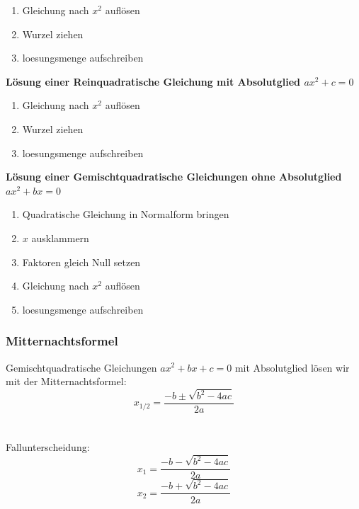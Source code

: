 \begin{multicols}{2}
    \begin{enumerate}
        \item Gleichung nach $x^2$ auflösen
        \item Wurzel ziehen
        \item loesungsmenge aufschreiben
    \end{enumerate}
    \textbf{Lösung einer Reinquadratische Gleichung mit Absolutglied $ax^2 + c = 0$}

    \begin{enumerate}
        \item Gleichung nach $x^2$ auflösen
        \item Wurzel ziehen
        \item loesungsmenge aufschreiben
    \end{enumerate}
    \textbf{Lösung einer Gemischtquadratische Gleichungen ohne Absolutglied $ax^2 + bx = 0$}

    \begin{enumerate}
        \item Quadratische Gleichung in Normalform bringen
        \item $x$ ausklammern
        \item  Faktoren gleich Null setzen
        \item Gleichung nach $x^2$ auflösen
        \item loesungsmenge aufschreiben
    \end{enumerate}

    \subsubsection{Mitternachtsformel}
    \vspace{-4mm}
    Gemischtquadratische Gleichungen $ax^2 + bx + c = 0$ mit Absolutglied lösen wir mit der Mitternachtsformel:
    \[x_{1/2} = \frac{-b \pm \sqrt{b^2 - 4ac}}{2a}\]\\~\\
    Fallunterscheidung:
    \[x_{1} = \dfrac{-b - \sqrt{b^2 - 4ac}}{2a}\]
    \[x_{2} = \dfrac{-b + \sqrt{b^2 - 4ac}}{2a}\]\\~\\


\end{multicols}
